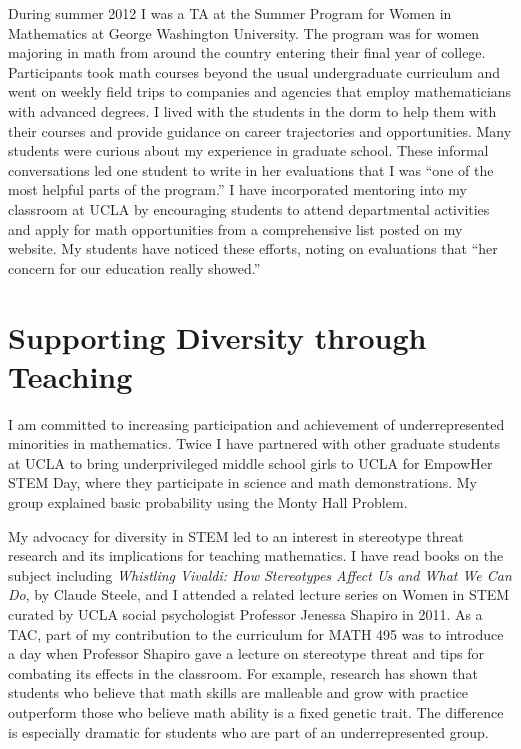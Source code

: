 \documentclass[12pt]{article}
\begin{document}
During summer 2012 I was a TA at the Summer Program for Women in Mathematics at George Washington University.  The program was for women majoring in math from around the country entering their final year of college.  Participants took math courses beyond the usual undergraduate curriculum and went on weekly field trips to companies and agencies that employ mathematicians with advanced degrees.  I lived with the students in the dorm to help them with their courses and provide guidance on career trajectories and opportunities.  Many students were curious about my experience in graduate school.  These informal conversations led one student to write in her evaluations that I was ``one of the most helpful parts of the program.''  I have incorporated mentoring into my classroom at UCLA by encouraging students to attend departmental activities and apply for math opportunities from a comprehensive list posted on my website.  My students have noticed these efforts, noting on evaluations that ``her concern for our education really showed.''

\section*{Supporting Diversity through Teaching}
I am committed to increasing participation and achievement of underrepresented minorities in mathematics.  Twice I have partnered with other graduate students at UCLA to bring underprivileged middle school girls to UCLA for EmpowHer STEM Day, where they participate in science  and math demonstrations.  My group explained basic probability using the Monty Hall Problem.  

My advocacy for diversity in STEM led to an interest in stereotype threat research and its implications for teaching mathematics.  I have read books on the subject including \textit{Whistling Vivaldi: How Stereotypes Affect Us and What We Can Do}, by Claude Steele, and I attended a related lecture series on Women in STEM curated by UCLA social psychologist Professor Jenessa Shapiro in 2011.  As a TAC, part of my contribution to the curriculum for MATH 495 was to introduce a day when Professor Shapiro gave a lecture on stereotype threat and tips for combating its effects in the classroom.  For example, research has shown that students who believe that math skills are malleable and grow with practice outperform those who believe math ability is a fixed genetic trait.  The difference is especially dramatic for students who are part of an underrepresented group.  
\end{document}
